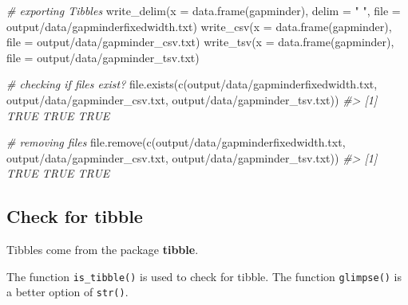 \documentclass[
]{book}
\newenvironment{Shaded}{\begin{snugshade}}{\end{snugshade}}
\newcommand{\AttributeTok}[1]{\textcolor[rgb]{0.77,0.63,0.00}{#1}}
\newcommand{\CommentTok}[1]{\textcolor[rgb]{0.56,0.35,0.01}{\textit{#1}}}
\newcommand{\FunctionTok}[1]{\textcolor[rgb]{0.00,0.00,0.00}{#1}}
\newcommand{\NormalTok}[1]{#1}
\newcommand{\StringTok}[1]{\textcolor[rgb]{0.31,0.60,0.02}{#1}}
\begin{document}
\begin{Shaded}
\begin{Highlighting}[]
\CommentTok{\# exporting Tibbles}
\FunctionTok{write\_delim}\NormalTok{(}\AttributeTok{x =} \FunctionTok{data.frame}\NormalTok{(gapminder), }\AttributeTok{delim =} \StringTok{" "}\NormalTok{, }\AttributeTok{file =} \StringTok{\textquotesingle{}output/data/gapminderfixedwidth.txt\textquotesingle{}}\NormalTok{)}
\FunctionTok{write\_csv}\NormalTok{(}\AttributeTok{x =} \FunctionTok{data.frame}\NormalTok{(gapminder), }\AttributeTok{file =} \StringTok{\textquotesingle{}output/data/gapminder\_csv.txt\textquotesingle{}}\NormalTok{)}
\FunctionTok{write\_tsv}\NormalTok{(}\AttributeTok{x =} \FunctionTok{data.frame}\NormalTok{(gapminder), }\AttributeTok{file =} \StringTok{\textquotesingle{}output/data/gapminder\_tsv.txt\textquotesingle{}}\NormalTok{)}

\CommentTok{\# checking if files exist?}
\FunctionTok{file.exists}\NormalTok{(}\FunctionTok{c}\NormalTok{(}\StringTok{\textquotesingle{}output/data/gapminderfixedwidth.txt\textquotesingle{}}\NormalTok{, }\StringTok{\textquotesingle{}output/data/gapminder\_csv.txt\textquotesingle{}}\NormalTok{, }\StringTok{\textquotesingle{}output/data/gapminder\_tsv.txt\textquotesingle{}}\NormalTok{))}
\CommentTok{\#\textgreater{} [1] TRUE TRUE TRUE}

\CommentTok{\# removing files}
\FunctionTok{file.remove}\NormalTok{(}\FunctionTok{c}\NormalTok{(}\StringTok{\textquotesingle{}output/data/gapminderfixedwidth.txt\textquotesingle{}}\NormalTok{, }\StringTok{\textquotesingle{}output/data/gapminder\_csv.txt\textquotesingle{}}\NormalTok{, }\StringTok{\textquotesingle{}output/data/gapminder\_tsv.txt\textquotesingle{}}\NormalTok{))}
\CommentTok{\#\textgreater{} [1] TRUE TRUE TRUE}
\end{Highlighting}
\end{Shaded}

\hypertarget{tr-inspect}{%
\subsection{Check for tibble}\label{tr-inspect}}

Tibbles come from the package \textbf{tibble}.

The function \texttt{is\_tibble()} is used to check for tibble.
The function \texttt{glimpse()} is a better option of \texttt{str()}.
\end{document}
